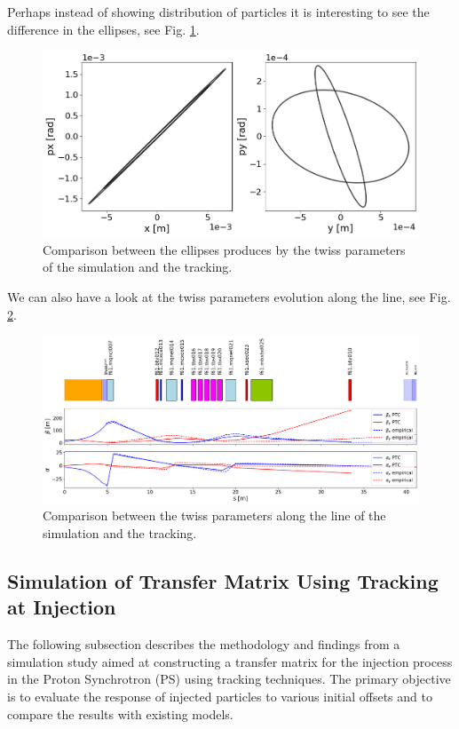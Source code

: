 Perhaps instead of showing distribution of particles it is interesting to see the difference in the ellipses, see Fig. \ref{fig:ellipses.}.

\begin{figure}[H]
\centering
\includegraphics[width=1.0\textwidth]{02_Simulation/images/ellipses.png}
\caption{Comparison between the ellipses produces by the twiss parameters of the simulation and the tracking.}
\label{fig:ellipses.}
\end{figure}

We can also have a look at the twiss parameters evolution along the line, see Fig. \ref{fig:twiss_params}.

\begin{figure}[H]
\centering
\includegraphics[width=1.0\textwidth]{02_Simulation/images/twiss_parameters_comparison.png}
\caption{Comparison between the twiss parameters along the line of the simulation and the tracking.}
\label{fig:twiss_params}
\end{figure}

\subsection{Simulation of Transfer Matrix Using Tracking at Injection}

The following subsection describes the methodology and findings from a simulation study aimed at constructing a transfer matrix for the injection process in the Proton Synchrotron (PS) using tracking techniques. The primary objective is to evaluate the response of injected particles to various initial offsets and to compare the results with existing models.

